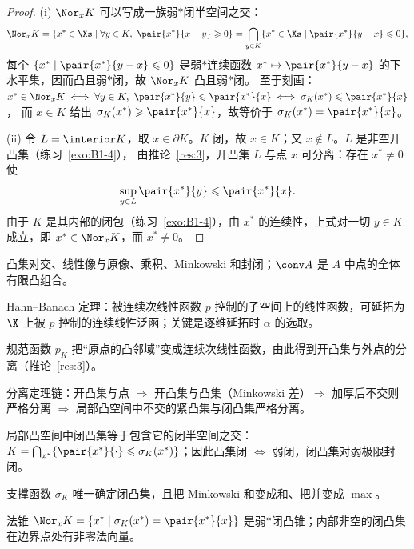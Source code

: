 \begin{proof}
(i) $\Nor_xK$ 可以写成一族弱$*$闭半空间之交：
\[
  \Nor_xK=\{x^*\in\Xs\mid\forall y\in K,\ \pair{x^*}{x-y}\geqslant0\}=\bigcap_{y\in K}\{x^*\in\Xs\mid\pair{x^*}{y-x}\leqslant0\},
\]
每个 $\{x^*\mid\pair{x^*}{y-x}\leqslant0\}$ 是弱$*$连续函数 $x^*\mapsto\pair{x^*}{y-x}$ 的下水平集，因而凸且弱$*$闭，故 $\Nor_xK$ 凸且弱$*$闭。
至于刻画：$x^*\in\Nor_xK\iff\forall y\in K,\ \pair{x^*}{y}\leqslant\pair{x^*}{x}\iff\sigma_K(x^*)\leqslant\pair{x^*}{x}$，
而 $x\in K$ 给出 $\sigma_K(x^*)\geqslant\pair{x^*}{x}$，故等价于 $\sigma_K(x^*)=\pair{x^*}{x}$。

(ii) 令 $L=\interior K$，取 $x\in\partial K$。$K$ 闭，故 $x\in K$；又 $x\notin L$。$L$ 是非空开凸集（练习~\ref{exo:B1-4}），
由推论~\ref{res:3}，开凸集 $L$ 与点 $x$ 可分离：存在 $x^*\neq0$ 使
\[
  \sup_{y\in L}\pair{x^*}{y}\leqslant\pair{x^*}{x}.
\]
由于 $K$ 是其内部的闭包（练习~\ref{exo:B1-4}），由 $x^*$ 的连续性，上式对一切 $y\in K$ 成立，即 $x^*\in\Nor_xK$，而 $x^*\neq0$。
\end{proof}

\begin{keypoints}
  \item 凸集对交、线性像与原像、乘积、Minkowski 和封闭；$\conv A$ 是 $A$ 中点的全体有限凸组合。
  \item Hahn--Banach 定理：被连续次线性函数 $p$ 控制的子空间上的线性函数，可延拓为 $\X$ 上被 $p$ 控制的连续线性泛函；关键是逐维延拓时 $\alpha$ 的选取。
  \item 规范函数 $p_K$ 把“原点的凸邻域”变成连续次线性函数，由此得到开凸集与外点的分离（推论~\ref{res:3}）。
  \item 分离定理链：开凸集与点 $\Rightarrow$ 开凸集与凸集（Minkowski 差）$\Rightarrow$ 加厚后不交则严格分离 $\Rightarrow$ 局部凸空间中不交的紧凸集与闭凸集严格分离。
  \item 局部凸空间中闭凸集等于包含它的闭半空间之交：$K=\bigcap_{x^*}\{\pair{x^*}{\cdot}\leqslant\sigma_K(x^*)\}$；因此凸集闭 $\iff$ 弱闭，闭凸集对弱极限封闭。
  \item 支撑函数 $\sigma_K$ 唯一确定闭凸集，且把 Minkowski 和变成和、把并变成 $\max$。
  \item 法锥 $\Nor_xK=\{x^*\mid\sigma_K(x^*)=\pair{x^*}{x}\}$ 是弱$*$闭凸锥；内部非空的闭凸集在边界点处有非零法向量。
\end{keypoints}
